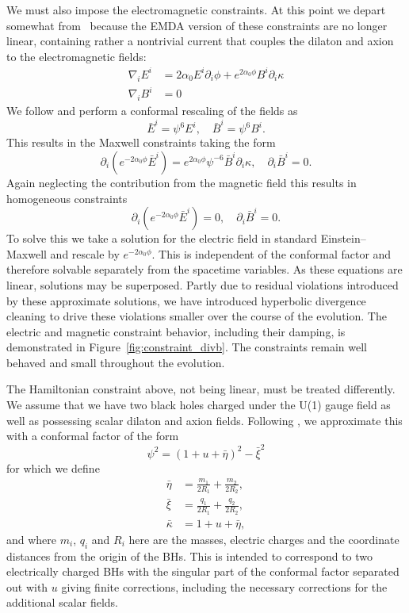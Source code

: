 We must also impose the electromagnetic constraints. At this point we  depart somewhat from~\cite{Bozzola2019} because the EMDA version of these constraints are no longer linear, containing rather a nontrivial current that couples the dilaton and axion to the electromagnetic fields: 
\begin{align}
\nabla_i E^i &= 2\alpha_0 E^i \partial_i \phi + e^{2\alpha_0 \phi} B^i \partial_i \kappa \\
\nabla_i B^i &= 0 
\end{align} 
 We  
follow \cite{Alcubierre2009,Zilhao2012} and perform a conformal rescaling of the fields as
\begin{equation}
    \bar{E}^i = \psi^6 E^i, 
    \quad
    \bar{B}^i = \psi^6 B^i.  
\end{equation}
This results in the  Maxwell constraints taking the form 
\begin{equation}
    \partial_i ( e^{-2\alpha_0\phi} \bar{E}^i) = e^{2\alpha_0 \phi} \psi^{-6} {\bar B}^i \partial_i \kappa, 
    \quad
    \partial_i \bar{B}^i = 0.
\end{equation}
Again neglecting the contribution from the magnetic field this results in homogeneous constraints  
\begin{equation}
    \partial_i (e^{-2\alpha_0\phi} \bar{E}^i) = 0, 
    \quad
    \partial_i \bar{B}^i = 0.
\end{equation}
To solve this we take a solution for the electric field in standard Einstein--Maxwell and  rescale by $e^{-2 \alpha_0 \phi}$. This is independent of the conformal factor and therefore solvable separately from the spacetime variables. As these equations are linear, solutions may be superposed. Partly due to residual violations introduced by these approximate solutions,  we have introduced hyperbolic divergence cleaning to drive these violations smaller over the course of the evolution. The electric and magnetic constraint behavior, including their damping, is demonstrated in Figure~\ref{fig:constraint_divb}. The constraints remain well behaved and small throughout the evolution.    

The Hamiltonian constraint above, not being linear, must be treated differently.  We assume that we have two black holes charged under the U(1) gauge field as well as possessing scalar dilaton and axion fields.  Following \cite{Bozzola2019}, we approximate this with a conformal factor of the form 
\begin{equation}
    \psi^2 = (1 + u + \bar{\eta} )^2 - \bar{\xi}^2 
\end{equation}
for which we define 
\begin{align}
   \bar{\eta} &= \frac{m_1}{2R_1} + \frac{m_2}{2R_2}, \\
   \bar{\xi}  &= \frac{q_1}{2R_1} + \frac{q_2}{2R_2}, \\ 
   \bar{\kappa} &= 1+ u + {\bar\eta},
\end{align}
and where $m_i$, $q_i$ and $R_i$ here are the masses, electric charges and the coordinate distances from the origin of the BHs.  This is intended to correspond to two electrically charged BHs with the singular part of the conformal factor separated out with $u$ giving finite corrections, including the necessary corrections for the additional scalar fields. 

